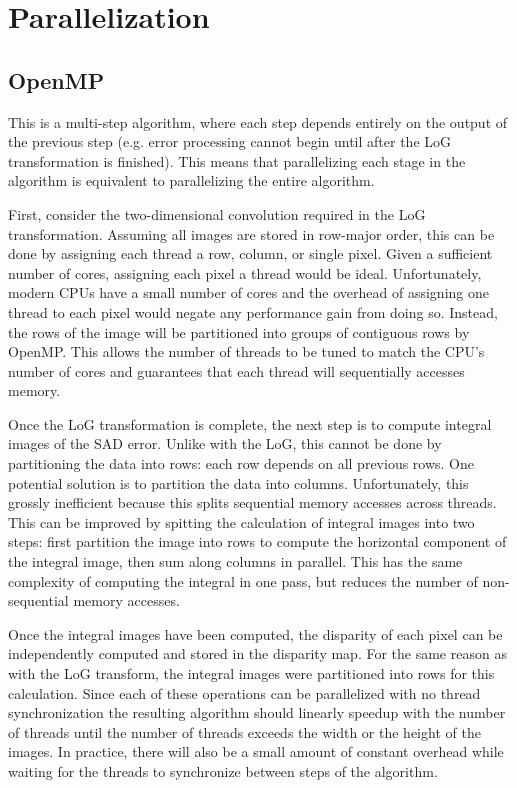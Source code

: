 \documentclass{article}
\begin{document}
\section{Parallelization}
\label{sec:parallel}

\subsection{OpenMP}
\label{sec:parallel-omp}
This is a multi-step algorithm, where each step depends entirely on the output
of the previous step (e.g. error processing cannot begin until after the LoG
transformation is finished). This means that parallelizing each stage in the
algorithm is equivalent to parallelizing the entire algorithm.

First, consider the two-dimensional convolution required in the LoG
transformation. Assuming all images are stored in row-major order, this can be
done by assigning each thread a row, column, or single pixel. Given a
sufficient number of cores, assigning each pixel a thread would be ideal.
Unfortunately, modern CPUs have a small number of cores and the overhead of
assigning one thread to each pixel would negate any performance gain from doing
so. Instead, the rows of the image will be partitioned into groups of
contiguous rows by OpenMP. This allows the number of threads to be tuned to
match the CPU's number of cores and guarantees that each thread will
sequentially accesses memory.

Once the LoG transformation is complete, the next step is to compute integral
images of the SAD error. Unlike with the LoG, this cannot be done by
partitioning the data into rows: each row depends on all previous rows. One
potential solution is to partition the data into columns. Unfortunately, this
grossly inefficient because this splits sequential memory accesses across
threads. This can be improved by spitting the calculation of integral images
into two steps: first partition the image into rows to compute the horizontal
component of the integral image, then sum along columns in parallel. This has
the same complexity of computing the integral in one pass, but reduces the
number of non-sequential memory accesses.

Once the integral images have been computed, the disparity of each pixel can be
independently computed and stored in the disparity map. For the same reason as
with the LoG transform, the integral images were partitioned into rows for this
calculation. Since each of these operations can be parallelized with no thread
synchronization the resulting algorithm should linearly speedup with the number
of threads until the number of threads exceeds the width or the height of the
images. In practice, there will also be a small amount of constant overhead 
while waiting for the threads to synchronize between steps of the algorithm.
\end{document}
